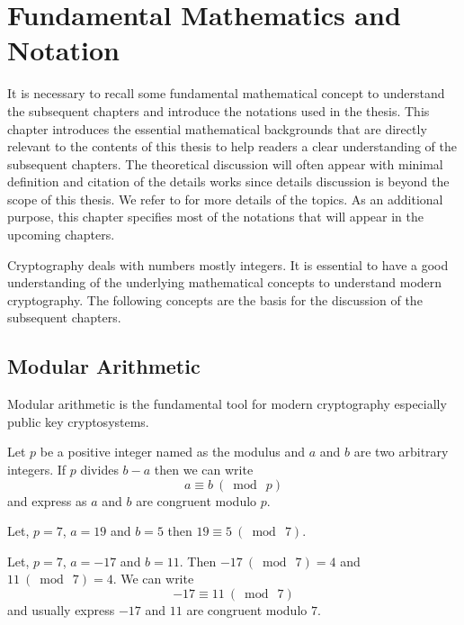 \chapter{Fundamental Mathematics and Notation}
\label{chap:fundamentals} 
It is necessary to recall some fundamental mathematical concept to understand the subsequent chapters and introduce the notations used in the thesis.
This chapter introduces the essential mathematical backgrounds that are directly relevant to the contents of this thesis to help readers a clear understanding of the subsequent chapters.
The theoretical discussion will often appear with minimal definition and citation of the details works since details discussion is beyond the scope of this thesis.
We refer to \cite{lidl_niederreiter_1996, book_HFFMullen2013, book_CMSSmart2015, book_GPCMrabet2016, book_CSCBlahut} for more details of the topics. 
As an additional purpose, this chapter specifies most of the notations that will appear in the upcoming chapters.

Cryptography deals with numbers mostly integers.
It is essential to have a good understanding of the underlying mathematical concepts to understand modern cryptography.
The following concepts are the basis for the discussion of the subsequent chapters.

\section{Modular Arithmetic}
\label{sec:chap:fund:modular_arithm} 
Modular arithmetic is the fundamental tool for modern cryptography especially public key cryptosystems.
\begin{definition}
	Let  $p$ be a positive integer named as the modulus  and  $a$ and $b$  are two arbitrary integers. 
	If  $p$ divides $b-a$  then we can write
	$$ a \equiv b ~(\bmod ~p)$$
	and express as $a$ and $b$ are congruent modulo $p$.
\end{definition}
\begin{example}
	Let, $p =7$, $a=19$ and $b=5$ then 
	$19  \equiv  5 ~(\bmod ~7) $.
\end{example}

\begin{example}
	Let, $p =7$, $a=-17$  and $b=11$. Then $-17  ~(\bmod ~7)  = 4$ and $11 ~(\bmod ~7) = 4$. 
	We can write 
	$$-17  \equiv  11 ~(\bmod ~7) $$ 
	and usually express $-17$ and $11$ are congruent modulo $7$.
\end{example}

